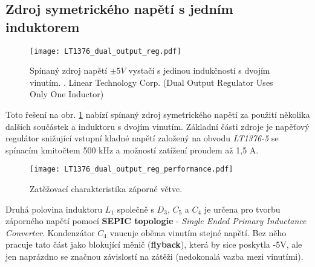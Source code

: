 {    \subsection{Zdroj symetrického napětí s jedním induktorem}
      \begin{figure}[ht!]
        \centering
        \texttt{[image: LT1376\_dual\_output\_reg.pdf]}
        \caption[Spínaný zdroj napětí $\pm5 V$ vystačí s jedinou indukčností s dvojím
                 vinutím]{Spínaný zdroj napětí $\pm5 V$ vystačí s jedinou indukčností s dvojím
                 vinutím. \cite{DN100}. Linear Technology Corp. (Dual Output Regulator Uses Only
                 One Inductor)}
        \label{enz:fig_LT1376_cir1}
      \end{figure}
      Toto řešení na obr. \ref{enz:fig_LT1376_cir1} nabízí spínaný zdroj symetrického napětí za
      použití několika dalších součástek a induktoru s dvojím vinutím. Základní části zdroje je
      napěťový regulátor snižující vstupní kladné napětí založený na obvodu \emph{LT1376-5} se
      spínacím kmitočtem 500 kHz a možností zatížení proudem až 1,5 A.

      \begin{figure}[ht!]
        \centering
        \texttt{[image: LT1376\_dual\_output\_reg\_performance.pdf]}
        \caption{Zatěžovací charakteristika záporné větve.}
        \label{enz:fig_LT1376_cir1_perform}
      \end{figure}

      Druhá polovina induktoru $L_1$ společně s $D_3$, $C_5$ a $C_4$ je určena pro tvorbu
      záporného napětí pomocí \textbf{SEPIC topologie} - \emph{Single Ended Primary Inductance
      Converter}. Kondenzátor $C_4$ vnucuje oběma vinutím stejné napětí. Bez něho pracuje tato
      část jako blokující měnič (\textbf{flyback}), která by sice poskytla -5V, ale jen naprázdno
      se značnou závislostí na zátěži (nedokonalá vazba mezi vinutími).

} %
\printbibliography[title={Seznam literatury}, heading=subbibliography]
